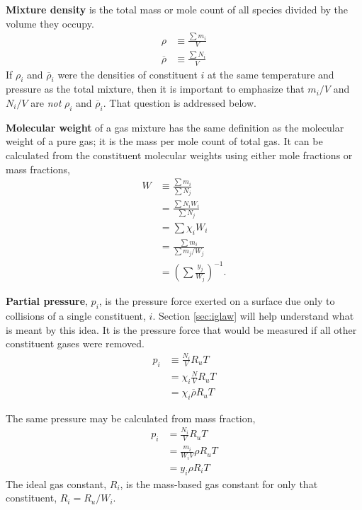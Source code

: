 {\bf Mixture density} is the total mass or mole count of all species divided by the volume they occupy.  
\begin{subequations}
\begin{align}
\rho &\equiv \frac{\sum m_i}{V}\\
\overline{\rho} &\equiv \frac{\sum N_i}{V}
\end{align}
\end{subequations}
If $\rho_i$ and $\overline{\rho}_i$ were the densities of constituent $i$ at the same temperature and pressure as the total mixture, then it is important to emphasize that $m_i / V$  and $N_i / V$ are \emph{not} $\rho_i$ and $\overline{\rho}_i$.  That question is addressed below.

{\bf Molecular weight} of a gas mixture has the same definition as the molecular weight of a pure gas; it is the mass per mole count of total gas.  It can be calculated from the constituent molecular weights using either mole fractions or mass fractions,
\begin{subequations}
\begin{align}
W &\equiv \frac{\sum m_i}{\sum N_j}\\
 &= \frac{\sum N_i W_i}{\sum N_j}\nonumber\\
 &= \sum \chi_i W_i\label{eqn:w:x}\\
 &= \frac{\sum m_i}{\sum m_j / W_j}\nonumber\\\
 &= \left(\sum \frac{y_j}{W_j} \right)^{-1}.\label{eqn:w:y}
\end{align}
\end{subequations}

{\bf Partial pressure}, $p_i$, is the pressure force exerted on a surface due only to collisions of a single constituent, $i$.  Section \ref{sec:iglaw} will help understand what is meant by this idea.  It is the pressure force that would be measured if all other constituent gases were removed.  
\begin{align}
p_i &\equiv \frac{N_i}{V} R_u T \nonumber\\
 &= \chi_i \frac{N}{V} R_u T \nonumber\\
 &= \chi_i \overline{\rho} R_u T
\end{align}

The same pressure may be calculated from mass fraction,
\begin{align}
p_i &= \frac{N_i}{V} R_u T \nonumber\\
 &= \frac{m_i}{W_i V} \rho R_u T \nonumber\\
 &= y_i \rho R_i T
\end{align}
The ideal gas constant, $R_i$, is the mass-based gas constant for only that constituent, $R_i = R_u / W_i$.

